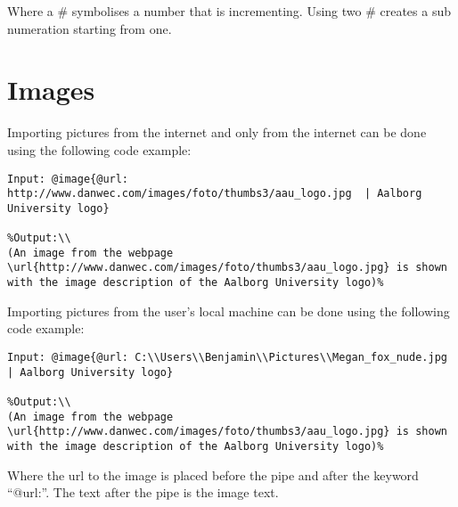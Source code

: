 Where a \# symbolises a number that is incrementing. Using two \# creates a sub numeration starting from one.

\section{Images}
Importing pictures from the internet and only from the internet can be done using the following code example:

\begin{lstlisting}[frame=single] %Internet
Input: @image{@url: http://www.danwec.com/images/foto/thumbs3/aau_logo.jpg  | Aalborg University logo}

%Output:\\
(An image from the webpage \url{http://www.danwec.com/images/foto/thumbs3/aau_logo.jpg} is shown with the image description of the Aalborg University logo)%
\end{lstlisting} %

Importing pictures from the user's local machine can be done using the following code example:

\begin{lstlisting}[frame=single] %Local image
Input: @image{@url: C:\\Users\\Benjamin\\Pictures\\Megan_fox_nude.jpg  | Aalborg University logo}

%Output:\\
(An image from the webpage \url{http://www.danwec.com/images/foto/thumbs3/aau_logo.jpg} is shown with the image description of the Aalborg University logo)%
\end{lstlisting} %

Where the url to the image is placed before the pipe and after the keyword ``@url:''. The text after the pipe is the image text.
